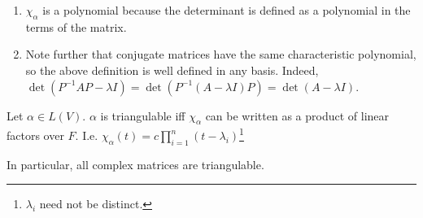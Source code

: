 \begin{remark}
	\begin{enumerate}
		\item $\chi_\alpha$ is a polynomial because the determinant is defined as a polynomial in the terms of the matrix.
		\item Note further that conjugate matrices have the same characteristic polynomial, so the above definition is well defined in any basis.
		Indeed, $\det(P^{-1}A P - \lambda I) = \det(P^{-1}(A - \lambda I)P) = \det(A - \lambda I)$.
	\end{enumerate} 
\end{remark}

\begin{theorem}
	Let $\alpha \in L(V)$.
	$\alpha$ is triangulable iff $\chi_\alpha$ can be written as a product of linear factors over $F$.
	I.e. $\chi_\alpha(t) = c \prod_{i = 1}^n (t - \lambda_i)$\footnote{$\lambda_i$ need not be distinct.}
\end{theorem}

\begin{corollary}
	In particular, all complex matrices are triangulable.
\end{corollary} 

